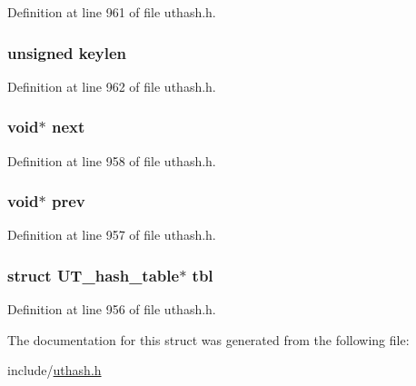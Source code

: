 Definition at line 961 of file uthash.\+h.

\subsubsection[{\texorpdfstring{keylen}{keylen}}]{\setlength{\rightskip}{0pt plus 5cm}unsigned keylen}\hypertarget{struct_u_t__hash__handle_a4563ea2b1ae1597aa9fd62e005d447b4}{}\label{struct_u_t__hash__handle_a4563ea2b1ae1597aa9fd62e005d447b4}


Definition at line 962 of file uthash.\+h.

\subsubsection[{\texorpdfstring{next}{next}}]{\setlength{\rightskip}{0pt plus 5cm}void$\ast$ next}\hypertarget{struct_u_t__hash__handle_a75b19ffcca77bfc647ff02695958fd95}{}\label{struct_u_t__hash__handle_a75b19ffcca77bfc647ff02695958fd95}


Definition at line 958 of file uthash.\+h.

\subsubsection[{\texorpdfstring{prev}{prev}}]{\setlength{\rightskip}{0pt plus 5cm}void$\ast$ prev}\hypertarget{struct_u_t__hash__handle_af714e69444763fb9a76ec901a014baf1}{}\label{struct_u_t__hash__handle_af714e69444763fb9a76ec901a014baf1}


Definition at line 957 of file uthash.\+h.

\subsubsection[{\texorpdfstring{tbl}{tbl}}]{\setlength{\rightskip}{0pt plus 5cm}struct {\bf U\+T\+\_\+hash\+\_\+table}$\ast$ tbl}\hypertarget{struct_u_t__hash__handle_af0deeb3fe5f35a4c85d105090b498c8d}{}\label{struct_u_t__hash__handle_af0deeb3fe5f35a4c85d105090b498c8d}


Definition at line 956 of file uthash.\+h.



The documentation for this struct was generated from the following file\+:\begin{DoxyCompactItemize}
\item 
include/\hyperlink{uthash_8h}{uthash.\+h}\end{DoxyCompactItemize}
